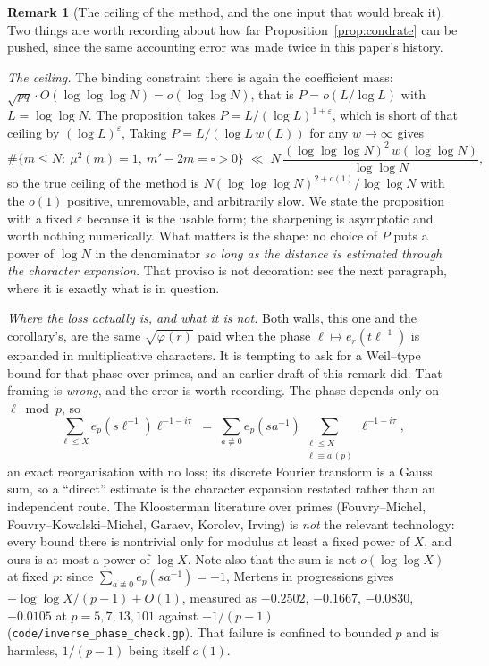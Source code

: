 \documentclass[11pt]{article}
\theoremstyle{definition}
\newtheorem{remark}[theorem]{Remark}
\begin{document}
\begin{remark}[The ceiling of the method, and the one input that would break it]\label{rem:a9ceiling}
Two things are worth recording about how far Proposition~\ref{prop:condrate} can be pushed, since
the same accounting error was made twice in this paper's history.

\emph{The ceiling.} The binding constraint there is again the coefficient mass:
$\sqrt{pq}\cdot O(\log\log\log N)=o(\log\log N)$, that is $P=o(L/\log L)$ with $L=\log\log N$. The
proposition takes $P=L/(\log L)^{1+\varepsilon}$, which is short of that ceiling by $(\log L)^{\varepsilon}$,  Taking $P=L/(\log L\,w(L))$ for any $w\to\infty$ gives
\[ \#\{m\le N:\ \mu^2(m)=1,\ m'-2m=\square>0\}\;\ll\;N\,\frac{(\log\log\log N)^2\,w(\log\log N)}{\log\log N}, \]
so the true ceiling of the method is $N(\log\log\log N)^{2+o(1)}/\log\log N$ with the $o(1)$
positive, unremovable, and arbitrarily slow. We state the proposition with a fixed $\varepsilon$
because it is the usable form; the sharpening is asymptotic and worth nothing numerically. What
matters is the shape: no choice of $P$ puts a power of $\log N$ in the denominator \emph{so long as
the distance is estimated through the character expansion}. That proviso is not decoration: see
the next paragraph, where it is exactly what is in question.

\emph{Where the loss actually is, and what it is not.} Both walls, this one and the corollary's, are the same $\sqrt{\varphi(r)}$ paid when the phase $\ell\mapsto e_r(t\ell^{-1})$ is expanded
in multiplicative characters. It is tempting to ask for a Weil--type bound for that phase over
primes, and an earlier draft of this remark did. That framing is \emph{wrong}, and the error is
worth recording. The phase depends only on $\ell\bmod p$, so
\[ \sum_{\ell\le X}e_p(s\ell^{-1})\ell^{-1-i\tau}
   \;=\;\sum_{a\not\equiv0}e_p(sa^{-1})\!\!\sum_{\substack{\ell\le X\\ \ell\equiv a\,(p)}}\!\!\ell^{-1-i\tau}, \]
an exact reorganisation with no loss; its discrete Fourier transform is a Gauss sum, so a ``direct''
estimate is the character expansion restated rather than an independent route. The Kloosterman
literature over primes (Fouvry--Michel, Fouvry--Kowalski--Michel, Garaev, Korolev, Irving) is
\emph{not} the relevant technology: every bound there is nontrivial only for modulus at least a fixed
power of $X$, and ours is at most a power of $\log X$. Note also that the sum is not $o(\log\log X)$
at fixed $p$: since $\sum_{a\not\equiv0}e_p(sa^{-1})=-1$, Mertens in progressions gives
$-\log\log X/(p-1)+O(1)$, measured as $-0.2502$, $-0.1667$, $-0.0830$, $-0.0105$ at
$p=5,7,13,101$ against $-1/(p-1)$
\textup{(\texttt{code/inverse\_phase\_check.gp})}. That failure is confined to bounded $p$ and is
harmless, $1/(p-1)$ being itself $o(1)$.


\end{remark}
\end{document}

